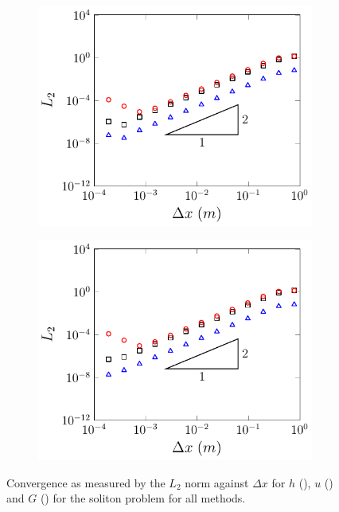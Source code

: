 \begin{figure}
\begin{subfigure}{0.5\textwidth}
		\vspace{0.5cm}
	\end{subfigure}
	\begin{subfigure}{0.5\textwidth}
		\includegraphics[width=\textwidth]{./chp5/figures/Analytic/Soliton/L2/D.pdf}
	\end{subfigure}%
	\begin{subfigure}{0.5\textwidth}
		\includegraphics[width=\textwidth]{./chp5/figures/Analytic/Soliton/L2/W.pdf}
	\end{subfigure}
	\caption{Convergence as measured by the $L_2$ norm against $\Delta x$ for $h$ (), $u$ () and $G$ () for the soliton problem for all methods.}
	\label{fig:SolitonL1All}
\end{figure}


